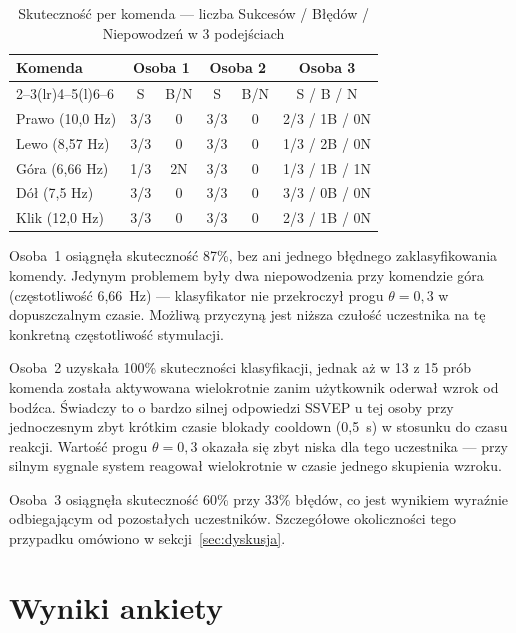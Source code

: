\begin{table}[!ht]
\centering
\caption{Skuteczność per komenda --- liczba Sukcesów / Błędów / Niepowodzeń
w 3 podejściach}
\label{tab:task2_per_cmd}
\begin{tabular}{lccccc}
    \toprule
    \textbf{Komenda} & \multicolumn{2}{c}{\textbf{Osoba 1}}
        & \multicolumn{2}{c}{\textbf{Osoba 2}}
        & \textbf{Osoba 3} \\
    \cmidrule(lr){2--3}\cmidrule(lr){4--5}\cmidrule(l){6--6}
    & S & B/N & S & B/N & S / B / N \\
    \midrule
    Prawo  (10,0 Hz) & 3/3 & 0 & 3/3 & 0     & 2/3 / 1B / 0N \\
    Lewo   (8,57 Hz) & 3/3 & 0 & 3/3 & 0     & 1/3 / 2B / 0N \\
    Góra   (6,66 Hz) & 1/3 & 2N & 3/3 & 0    & 1/3 / 1B / 1N \\
    Dół    (7,5 Hz)  & 3/3 & 0 & 3/3 & 0     & 3/3 / 0B / 0N \\
    Klik   (12,0 Hz) & 3/3 & 0 & 3/3 & 0     & 2/3 / 1B / 0N \\
    \bottomrule
\end{tabular}
\end{table}

Osoba~1 osiągnęła skuteczność 87\%, bez ani jednego błędnego
zaklasyfikowania komendy. Jedynym problemem były dwa niepowodzenia
przy komendzie góra (częstotliwość 6,66~Hz) --- klasyfikator
nie przekroczył progu $\theta = 0{,}3$ w dopuszczalnym czasie.
Możliwą przyczyną jest niższa czułość uczestnika na tę konkretną częstotliwość stymulacji.

Osoba~2 uzyskała 100\% skuteczności klasyfikacji, jednak aż
w 13 z 15 prób komenda została aktywowana wielokrotnie
zanim użytkownik oderwał wzrok od bodźca. Świadczy to o bardzo
silnej odpowiedzi SSVEP u tej osoby przy jednoczesnym zbyt krótkim
czasie blokady cooldown (0,5~s) w stosunku do czasu reakcji.
Wartość progu $\theta = 0{,}3$ okazała się zbyt niska
dla tego uczestnika --- przy silnym sygnale system reagował
wielokrotnie w czasie jednego skupienia wzroku.

Osoba~3 osiągnęła skuteczność 60\% przy 33\% błędów,
co jest wynikiem wyraźnie odbiegającym od pozostałych uczestników.
Szczegółowe okoliczności tego przypadku omówiono
w sekcji~\ref{sec:dyskusja}.

\section{Wyniki ankiety}



